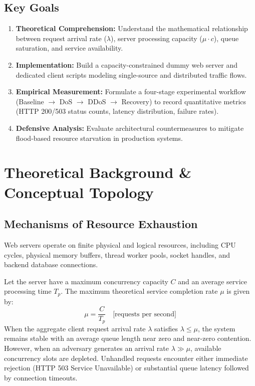 \documentclass[11pt,a4paper]{article}
\begin{document}
\subsection{Key Goals}
\begin{enumerate}[leftmargin=*]
    \item \textbf{Theoretical Comprehension:} Understand the mathematical relationship between request arrival rate ($\lambda$), server processing capacity ($\mu \cdot c$), queue saturation, and service availability.
    \item \textbf{Implementation:} Build a capacity-constrained dummy web server and dedicated client scripts modeling single-source and distributed traffic flows.
    \item \textbf{Empirical Measurement:} Formulate a four-stage experimental workflow (Baseline $\rightarrow$ DoS $\rightarrow$ DDoS $\rightarrow$ Recovery) to record quantitative metrics (HTTP 200/503 status counts, latency distribution, failure rates).
    \item \textbf{Defensive Analysis:} Evaluate architectural countermeasures to mitigate flood-based resource starvation in production systems.
\end{enumerate}

\section{Theoretical Background \& Conceptual Topology}

\subsection{Mechanisms of Resource Exhaustion}
Web servers operate on finite physical and logical resources, including CPU cycles, physical memory buffers, thread worker pools, socket handles, and backend database connections. 

Let the server have a maximum concurrency capacity $C$ and an average service processing time $T_p$. The maximum theoretical service completion rate $\mu$ is given by:
\begin{equation}
    \mu = \frac{C}{T_p} \quad \text{[requests per second]}
\end{equation}
When the aggregate client request arrival rate $\lambda$ satisfies $\lambda \le \mu$, the system remains stable with an average queue length near zero and near-zero contention. However, when an adversary generates an arrival rate $\lambda \gg \mu$, available concurrency slots are depleted. Unhandled requests encounter either immediate rejection (HTTP 503 Service Unavailable) or substantial queue latency followed by connection timeouts.
\end{document}
